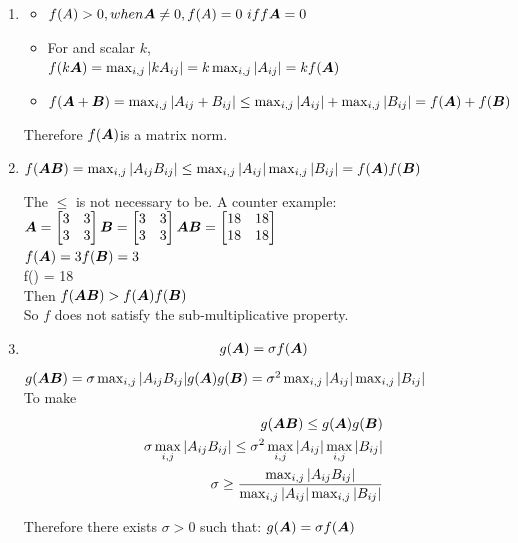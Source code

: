 \documentclass{article}
\begin{document}
\begin{enumerate} 

\item 
\begin{itemize}
\item  $f(A)>0, when \mA\neq0, \\ f(A)=0\ iff \mA=0 $
\item For and scalar $k$, \\  $ f(k\boldsymbol{A}) \\= \max_{i,j}|kA_{ij}| \\= k\max_{i,j}|A_{ij}| \\=kf(\boldsymbol{A})$
\item
$f(\boldsymbol{A}+\boldsymbol{B}) \\
=\max_{i,j}|A_{ij}+B_{ij}| \\ 
\leq \max_{i,j}|A_{ij}| + \max_{i,j}|B_{ij}| \\
=f(\boldsymbol{A}) + f(\boldsymbol{B})$
\end{itemize}
Therefore $f(\boldsymbol{A})$is a matrix norm. 
\item 
$f(\boldsymbol{A}\boldsymbol{B}) \\
=\max_{i,j}|A_{ij}B_{ij}|\\ 
\leq \max_{i,j}|A_{ij}|  \max_{i,j}|B_{ij}| \\
=f(\boldsymbol{A})f(\boldsymbol{B})$

The $\leq$ is not necessary to be.  A counter example: \\
$\boldsymbol{A}= \begin{bmatrix} 3 &3\\3&3 \end{bmatrix} \\
\boldsymbol{B}= \begin{bmatrix} 3&3\\3&3 \end{bmatrix} \\ 
\boldsymbol{A}\boldsymbol{B}= \begin{bmatrix} 18&18\\18&18 \end{bmatrix} $\\
$f(\boldsymbol{A}) = 3 \\ 
f(\boldsymbol{B}) = 3 $\\
f(\mA\mB) = 18 \\
Then $ f(\boldsymbol{A}\boldsymbol{B}) > f(\boldsymbol{A})f(\boldsymbol{B})  $\\
So $f$ does not satisfy the sub-multiplicative property. 

\item 
\begin{align} 
g(\boldsymbol{A}) = \sigma f(\boldsymbol{A}) 
\end{align}
$g(\boldsymbol{A}\boldsymbol{B}) =\sigma \max_{i,j}|A_{ij}B_{ij}|\\ 
g(\boldsymbol{A})g(\boldsymbol{B}) =\sigma^2\max_{i,j}|A_{ij}|  \max_{i,j}|B_{ij}|\\$\\
To make 
\begin{align} 
g(\boldsymbol{A}\boldsymbol{B}) \leq g(\boldsymbol{A})g(\boldsymbol{B}) \\
\sigma \max_{i,j}|A_{ij}B_{ij}| \leq \sigma^2\max_{i,j}|A_{ij}|  \max_{i,j}|B_{ij}| \\
\sigma \geq\frac{\max_{i,j}|A_{ij}B_{ij}|}{\max_{i,j}|A_{ij}|  \max_{i,j}|B_{ij}|} 
\end{align}

Therefore there exists $\sigma>0$ such that: $g(\boldsymbol{A})=\sigma f(\boldsymbol{A}) $
\end{enumerate} 
\end{document}
